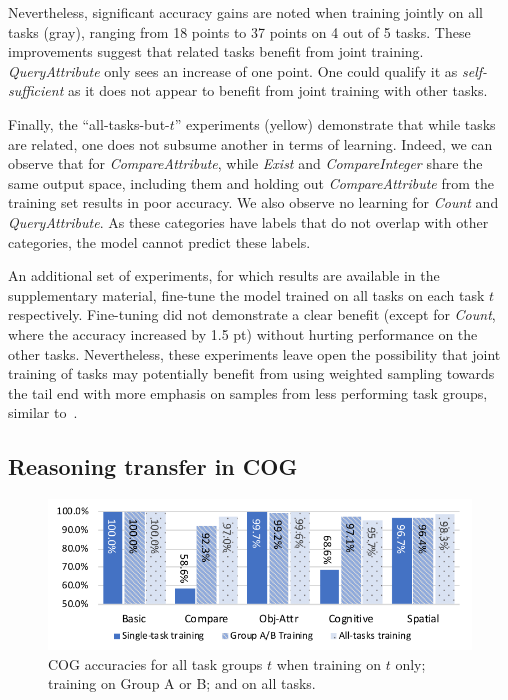 Nevertheless, significant accuracy gains are noted when training jointly on all tasks (gray), ranging from 18 points to 37 points on 4 out of 5 tasks. These improvements suggest that related tasks benefit from joint training. \textit{QueryAttribute} only sees an increase of one point. One could qualify it as \textit{self-sufficient} as it does not appear to benefit from joint training with other tasks.

Finally, the ``all-tasks-but-$t$'' experiments (yellow) demonstrate that while tasks are related, one does not subsume another in terms of learning. Indeed, we can observe that for \textit{CompareAttribute}, while \textit{Exist} and \textit{CompareInteger} share the same output space, including them and holding out \textit{CompareAttribute} from the training set results in poor accuracy.
We also observe no learning for \textit{Count} and \textit{QueryAttribute}. As these categories have labels that do not overlap with other categories, the model cannot predict these labels.

An additional set of experiments, for which results are available in the supplementary material, fine-tune the model trained on all tasks on each task $t$ respectively.
Fine-tuning did not demonstrate a clear benefit (except for \textit{Count}, where the accuracy increased by 1.5 pt) without hurting performance on the other tasks. Nevertheless, these experiments leave open the possibility that joint training of tasks may potentially benefit from using weighted sampling towards the tail end with more emphasis on samples from less performing task groups, similar to~\cite{guo2018dynamic, kendall2018multi}.

\subsection{Reasoning transfer in COG}
\label{sec:reasoning-cog}

\begin{figure}[htbp]
	\centering
	\includegraphics[width=\columnwidth]{../img/plots/cog_reasoning_transfer.pdf}
	\caption{COG accuracies for all task groups $t$ when training on $t$ only; training on Group A or B; and on all tasks.}
	\label{fig:COG-reasoning-results}
\end{figure}\vspace{2pt}

